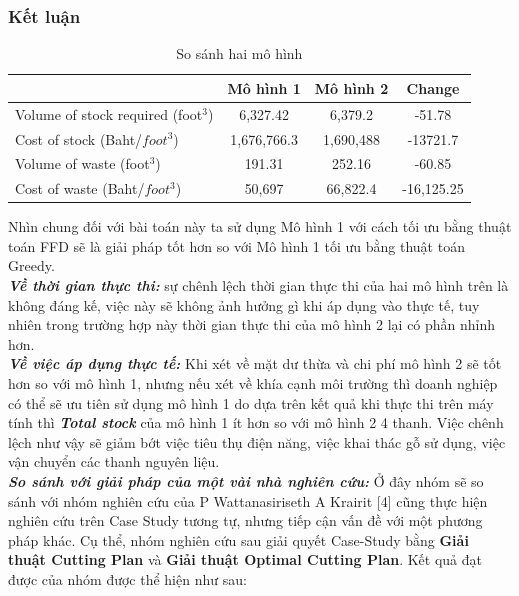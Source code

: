 \documentclass[a4paper]{article}
\begin{document}
\subsubsection{Kết luận}
\begin{table}[h]
    \centering
    \small
    \caption{So sánh hai mô hình}
    \label{tab:cutting_plans}
    \begin{tabular}{|l|c|c|c|}        
        \hline        
        & Mô hình 1 & Mô hình 2 & Change \\
        \hline        
        Volume of stock required (foot$^3$) & 6,327.42  & 6,379.2 & -51.78 \\
        \hline        
        Cost of stock (Baht/$foot^3$) & 1,676,766.3 & 1,690,488 & -13721.7 \\
        \hline
        Volume of waste (foot$^3$) & 191.31 & 252.16 & -60.85 \\
        \hline        
        Cost of waste (Baht/$foot^3$) & 50,697 & 66,822.4 & -16,125.25  \\
        \hline        
    \end{tabular}
\end{table}
\indent Nhìn chung đối với bài toán này ta sử dụng Mô hình 1 với cách tối ưu bằng thuật toán FFD sẽ là giải pháp tốt hơn so với Mô hình 1 tối ưu bằng thuật toán Greedy. \\
\indent \textbf{\textit{Về thời gian thực thi:}} sự chênh lệch thời gian thực thi của hai mô hình trên là không đáng kế, việc này sẽ không ảnh hưởng gì khi áp dụng vào thực tế, tuy nhiên trong trường hợp này thời gian thực thi của mô hình 2 lại có phần nhỉnh hơn. \\
\indent \textbf{\textit{Về việc áp dụng thực tế:}} Khi xét về mặt dư thừa và chi phí mô hình 2 sẽ tốt hơn so với mô hình 1, nhưng nếu xét về khía cạnh môi trường thì doanh nghiệp có thể sẽ ưu tiên sử dụng mô hình 1 do dựa trên kết quả khi thực thi trên máy tính thì \textbf{\textit{Total stock}} của mô hình 1 ít hơn so với mô hình 2 4 thanh. Việc chênh lệch như vậy sẽ giảm bớt việc tiêu thụ điện năng, việc khai thác gỗ sử dụng, việc vận chuyển các thanh  nguyên liệu. \\
\indent \textbf{\textit{So sánh với giải pháp của một vài nhà nghiên cứu:}} Ở đây nhóm sẽ so sánh với nhóm nghiên cứu của P Wattanasiriseth A Krairit [4] cũng thực hiện nghiên cứu trên Case Study tương tự, nhưng tiếp cận vấn đề với một phương pháp khác. Cụ thể, nhóm nghiên cứu sau giải quyết Case-Study bằng \textbf{Giải thuật Cutting Plan} và \textbf{Giải thuật Optimal Cutting Plan}. Kết quả đạt được của nhóm được thể hiện như sau:
\end{document}
